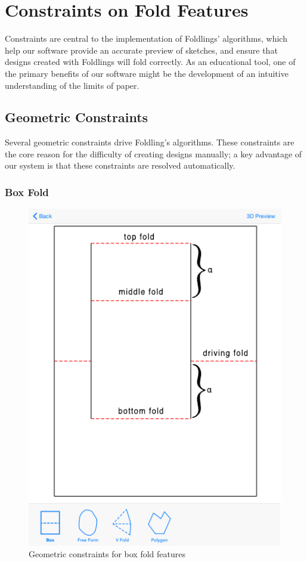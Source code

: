 \section{Constraints on Fold
Features}\label{constraints-on-fold-features}

Constraints are central to the implementation of Foldlings' algorithms,
which help our software provide an accurate preview of sketches, and
ensure that designs created with Foldlings will fold correctly. As an
educational tool, one of the primary benefits of our software might be
the development of an intuitive understanding of the limits of paper.

\subsection{Geometric Constraints}\label{geometric-constraints}

Several geometric constraints drive Foldling's algorithms. These
constraints are the core reason for the difficulty of creating designs
manually; a key advantage of our system is that these constraints are
resolved automatically.

\subsubsection{Box Fold}\label{box-fold}

\begin{figure}[htbp]
\centering
\includegraphics{figures/45_Tech_Constraints/boxfoldConstraints.pdf}
\caption{Geometric constraints for box fold features}
\end{figure}

